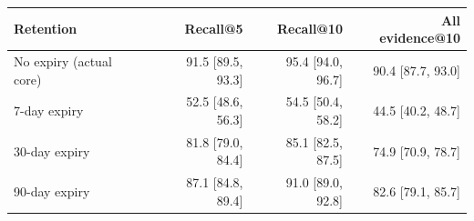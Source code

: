 \begin{tabular}{@{}lrrr@{}}\toprule Retention & Recall@5 & Recall@10 & All evidence@10\\\midrule
No expiry (actual core) & 91.5 [89.5, 93.3] & 95.4 [94.0, 96.7] & 90.4 [87.7, 93.0] \\
7-day expiry & 52.5 [48.6, 56.3] & 54.5 [50.4, 58.2] & 44.5 [40.2, 48.7] \\
30-day expiry & 81.8 [79.0, 84.4] & 85.1 [82.5, 87.5] & 74.9 [70.9, 78.7] \\
90-day expiry & 87.1 [84.8, 89.4] & 91.0 [89.0, 92.8] & 82.6 [79.1, 85.7] \\
\bottomrule\end{tabular}
